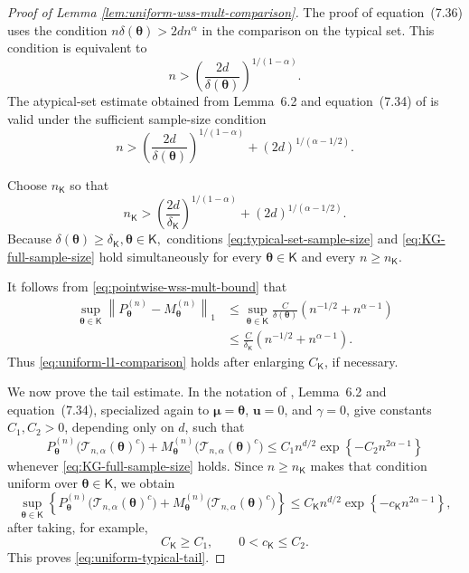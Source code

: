 \documentclass{article}
\theoremstyle{named}
\theoremstyle{named1}
\newcommand{\btheta}{\boldsymbol{\theta}}
\theoremstyle{plain}
\theoremstyle{remark}
\begin{document}
\begin{proof}[Proof of Lemma \ref{lem:uniform-wss-mult-comparison}]
The proof of equation~(7.36) uses the condition
$n\delta(\btheta)>2dn^\alpha$
in the comparison on the typical set. This condition is equivalent
to
\begin{equation}
\label{eq:typical-set-sample-size}
n>
\left(
    \frac{2d}{\delta(\btheta)}
\right)^{1/(1-\alpha)}.
\end{equation}
The atypical-set estimate obtained from Lemma~6.2 and
equation~(7.34) of \cite{Kahn&Guta} is valid under the sufficient
sample-size condition
\begin{equation}
\label{eq:KG-full-sample-size}
n>
\left(
    \frac{2d}{\delta(\btheta)}
\right)^{1/(1-\alpha)}
+
(2d)^{1/(\alpha-1/2)}.
\end{equation}

Choose $n_{\mathsf K}$ so that
\begin{equation}
\label{eq:n-K-choice}
n_{\mathsf K}
>
\left(
    \frac{2d}{\delta_{\mathsf K}}
\right)^{1/(1-\alpha)}
+
(2d)^{1/(\alpha-1/2)}.
\end{equation}
Because
$\delta(\btheta)\geq\delta_{\mathsf K},
\btheta\in\mathsf K,
$
conditions \eqref{eq:typical-set-sample-size} and \eqref{eq:KG-full-sample-size} hold simultaneously for
every $\btheta\in\mathsf K$ and every
$n\geq n_{\mathsf K}$.

It follows from \eqref{eq:pointwise-wss-mult-bound} that
\begin{align*}
\sup_{\btheta\in\mathsf K}
\left\|
    P_{\btheta}^{(n)}-M_{\btheta}^{(n)}
\right\|_1
&\leq
\sup_{\btheta\in\mathsf K}
\frac{C}{\delta(\btheta)}
\left(
    n^{-1/2}+n^{\alpha-1}
\right)\\
&\leq
\frac{C}{\delta_{\mathsf K}}
\left(
    n^{-1/2}+n^{\alpha-1}
\right).
\end{align*}
Thus \eqref{eq:uniform-l1-comparison} holds after enlarging
$C_{\mathsf K}$, if necessary.

We now prove the tail estimate. In the notation of
\cite{Kahn&Guta}, Lemma~6.2 and equation~(7.34), specialized again
to $\boldsymbol\mu=\btheta$, $\mathbf u=0$, and $\gamma=0$, give
constants $C_1,C_2>0$, depending only on $d$, such that
\begin{equation}
\label{eq:KG-combined-tail}
P_{\btheta}^{(n)}
\bigl(\mathcal T_{n,\alpha}(\btheta)^c\bigr)
+
M_{\btheta}^{(n)}
\bigl(\mathcal T_{n,\alpha}(\btheta)^c\bigr)
\leq
C_1n^{d/2}
\exp\!\left\{
    -C_2n^{2\alpha-1}
\right\}
\end{equation}
whenever \eqref{eq:KG-full-sample-size} holds. Since
$n\geq n_{\mathsf K}$ makes that condition uniform over
$\btheta\in\mathsf K$, we obtain
\[
\sup_{\btheta\in\mathsf K}
\left\{
    P_{\btheta}^{(n)}
    \bigl(\mathcal T_{n,\alpha}(\btheta)^c\bigr)
    +
    M_{\btheta}^{(n)}
    \bigl(\mathcal T_{n,\alpha}(\btheta)^c\bigr)
\right\}
\leq
C_{\mathsf K}n^{d/2}
\exp\!\left\{
    -c_{\mathsf K}n^{2\alpha-1}
\right\},
\]
after taking, for example,
\[
    C_{\mathsf K}\geq C_1,
    \qquad
    0<c_{\mathsf K}\leq C_2.
\]
This proves \eqref{eq:uniform-typical-tail}.
\end{proof}
\end{document}
